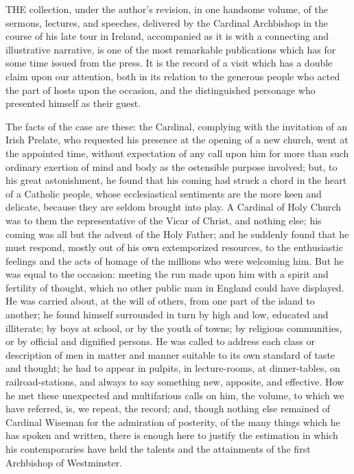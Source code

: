 THE
collection, under the author's revision, in one handsome volume, of
the sermons, lectures, and speeches, delivered by the Cardinal
Archbishop in the course of his late tour in Ireland, accompanied as
it is with a connecting and illustrative narrative, is one of the most
remarkable publications which has for some time issued from the press.
It is the record of a visit which has a double claim upon our
attention, both in its relation to the generous people who acted the
part of hosts upon the occasion, and the distinguished personage who
presented himself as their guest.

The facts of the case are
these: the Cardinal, complying with the invitation of an Irish
Prelate, who requested his presence at the opening of a new church,
went at the appointed time, without expectation of any call upon him
for more than such ordinary exertion of mind and body as the
ostensible purpose involved; but, to his great astonishment, he found
that his coming had struck a chord in the heart of a Catholic people,
whose ecclesiastical sentiments are the more keen and delicate,
because they are seldom brought into play. A Cardinal of Holy Church
was to them the representative of the Vicar of Christ, and nothing
else; his coming was all but the advent of the Holy Father; and he
suddenly found that he must respond, mostly out of his own
extemporized resources, to the enthusiastic feelings and the acts of
homage of the millions who were welcoming him. But he was equal to the
occasion: meeting the run made upon him with a spirit and fertility of
thought, which no other public man in England could have displayed. He
was carried about, at the will of others, from one part of the island
to another; he found himself surrounded in turn by high and low,
educated and illiterate; by boys at school, or by the youth of towns;
by religious communities, or by official and dignified persons. He was
called to address each class or description of men in matter and
manner suitable to its own standard of taste and thought; he had to
appear in pulpits, in lecture-rooms, at dinner-tables, on
railroad-stations, and always to say something new, apposite, and
effective. How he met these unexpected and multifarious calls on him,
the volume, to which we have referred, is, we repeat, the record; and,
though nothing else remained of Cardinal Wiseman for the admiration of
posterity, of the many things which he has spoken and written, there
is enough here to justify the estimation in which his contemporaries
have held the talents and the attainments of the first Archbishop of
Westminster.

